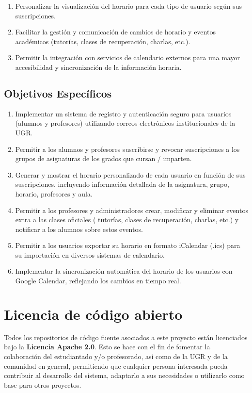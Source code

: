 \begin{enumerate}
    \item Personalizar la visualización del horario para cada tipo de usuario según sus suscripciones.
    \item Facilitar la gestión y comunicación de cambios de horario y eventos académicos (tutorías, clases de recuperación, charlas, etc.).
    \item Permitir la integración con servicios de calendario externos para una mayor accesibilidad y sincronización de la información horaria.
\end{enumerate}

\subsection{Objetivos Específicos}

\begin{enumerate}
    \item Implementar un sistema de registro y autenticación seguro para usuarios (alumnos y profesores) utilizando correos electrónicos institucionales de la UGR.
    \item Permitir a los alumnos y profesores suscribirse y revocar suscripciones a los grupos de asignaturas de los grados que cursan / imparten.
    \item Generar y mostrar el horario personalizado de cada usuario en función de sus suscripciones, incluyendo información detallada de la asignatura, grupo, horario, profesores y aula.
    \item Permitir a los profesores y administradores crear, modificar y eliminar eventos extra a las clases oficiales ( tutorías, clases de recuperación, charlas, etc.) y notificar a los alumnos sobre estos eventos.
    \item Permitir a los usuarios exportar su horario en formato iCalendar (.ics) para su importación en diversos sistemas de calendario.
    \item Implementar la sincronización automática del horario de los usuarios con Google Calendar, reflejando los cambios en tiempo real.
\end{enumerate}

\section{Licencia de código abierto}

Todos los repositorios de código fuente asociados a este proyecto están licenciados bajo la \textbf{Licencia Apache 2.0}. Esto se hace con el fin de fomentar la colaboración del estudiantado y/o profesorado, así como de la UGR y de la comunidad en general, permitiendo que cualquier persona interesada pueda contribuir al desarrollo del sistema, adaptarlo a sus necesidades o utilizarlo como base para otros proyectos.

